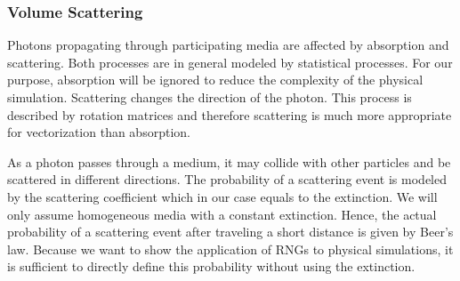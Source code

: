 \documentclass{stdlocal}
\begin{document}

    \subsubsection*{Volume Scattering} %
    \label{ssub:volume_scattering}
      Photons propagating through participating media are affected by absorption and scattering.
      Both processes are in general modeled by statistical processes.
      For our purpose, absorption will be ignored to reduce the complexity of the physical simulation.
      Scattering changes the direction of the photon.
      This process is described by rotation matrices and therefore scattering is much more appropriate for vectorization than absorption.
      \autocite{pharr2016}

      As a photon passes through a medium, it may collide with other particles and be scattered in different directions.
      The probability of a scattering event is modeled by the scattering coefficient which in our case equals to the extinction.
      We will only assume homogeneous media with a constant extinction.
      Hence, the actual probability of a scattering event after traveling a short distance is given by Beer's law.
      Because we want to show the application of RNGs to physical simulations, it is sufficient to directly define this probability without using the extinction.
      \autocite{pharr2016}
\end{document}
